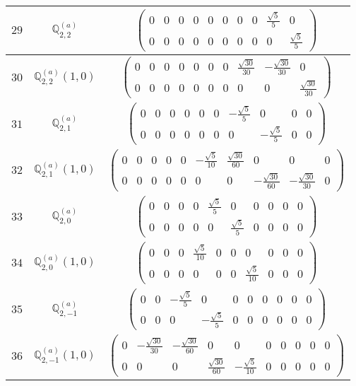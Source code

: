 \documentclass[fleqn,8pt,landscape]{jsarticle}
\begin{document}
\begin{center}
\begin{longtable}{ccc}
$ 29 $ & $ \mathbb{Q}_{2,2}^{(a)} $ & $ \begin{pmatrix} 0 & 0 & 0 & 0 & 0 & 0 & 0 & 0 & \frac{\sqrt{5}}{5} & 0 \\ 0 & 0 & 0 & 0 & 0 & 0 & 0 & 0 & 0 & \frac{\sqrt{5}}{5} \end{pmatrix} $ \\ \hline
$ 30 $ & $ \mathbb{Q}_{2,2}^{(a)}(1,0) $ & $ \begin{pmatrix} 0 & 0 & 0 & 0 & 0 & 0 & 0 & \frac{\sqrt{30}}{30} & - \frac{\sqrt{30}}{30} & 0 \\ 0 & 0 & 0 & 0 & 0 & 0 & 0 & 0 & 0 & \frac{\sqrt{30}}{30} \end{pmatrix} $ \\ \hline
$ 31 $ & $ \mathbb{Q}_{2,1}^{(a)} $ & $ \begin{pmatrix} 0 & 0 & 0 & 0 & 0 & 0 & - \frac{\sqrt{5}}{5} & 0 & 0 & 0 \\ 0 & 0 & 0 & 0 & 0 & 0 & 0 & - \frac{\sqrt{5}}{5} & 0 & 0 \end{pmatrix} $ \\ \hline
$ 32 $ & $ \mathbb{Q}_{2,1}^{(a)}(1,0) $ & $ \begin{pmatrix} 0 & 0 & 0 & 0 & 0 & - \frac{\sqrt{5}}{10} & \frac{\sqrt{30}}{60} & 0 & 0 & 0 \\ 0 & 0 & 0 & 0 & 0 & 0 & 0 & - \frac{\sqrt{30}}{60} & - \frac{\sqrt{30}}{30} & 0 \end{pmatrix} $ \\ \hline
$ 33 $ & $ \mathbb{Q}_{2,0}^{(a)} $ & $ \begin{pmatrix} 0 & 0 & 0 & 0 & \frac{\sqrt{5}}{5} & 0 & 0 & 0 & 0 & 0 \\ 0 & 0 & 0 & 0 & 0 & \frac{\sqrt{5}}{5} & 0 & 0 & 0 & 0 \end{pmatrix} $ \\ \hline
$ 34 $ & $ \mathbb{Q}_{2,0}^{(a)}(1,0) $ & $ \begin{pmatrix} 0 & 0 & 0 & \frac{\sqrt{5}}{10} & 0 & 0 & 0 & 0 & 0 & 0 \\ 0 & 0 & 0 & 0 & 0 & 0 & \frac{\sqrt{5}}{10} & 0 & 0 & 0 \end{pmatrix} $ \\ \hline
$ 35 $ & $ \mathbb{Q}_{2,-1}^{(a)} $ & $ \begin{pmatrix} 0 & 0 & - \frac{\sqrt{5}}{5} & 0 & 0 & 0 & 0 & 0 & 0 & 0 \\ 0 & 0 & 0 & - \frac{\sqrt{5}}{5} & 0 & 0 & 0 & 0 & 0 & 0 \end{pmatrix} $ \\ \hline
$ 36 $ & $ \mathbb{Q}_{2,-1}^{(a)}(1,0) $ & $ \begin{pmatrix} 0 & - \frac{\sqrt{30}}{30} & - \frac{\sqrt{30}}{60} & 0 & 0 & 0 & 0 & 0 & 0 & 0 \\ 0 & 0 & 0 & \frac{\sqrt{30}}{60} & - \frac{\sqrt{5}}{10} & 0 & 0 & 0 & 0 & 0 \end{pmatrix} $ \\ \hline

\end{longtable}
\end{center}
\end{document}
